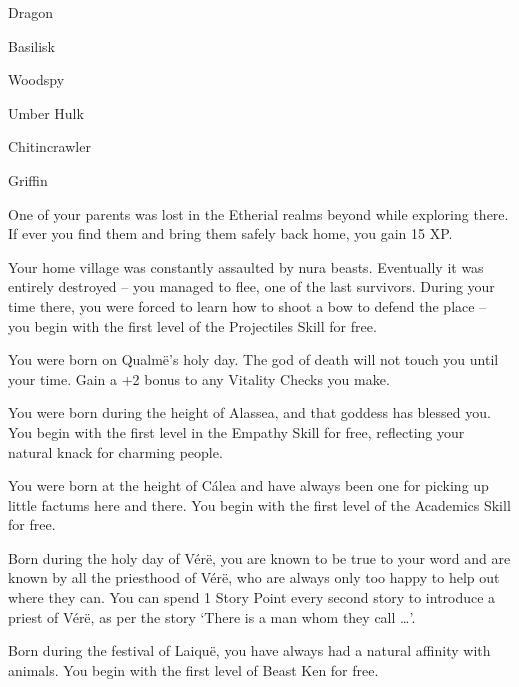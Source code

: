 \begin{multicols}{2}
\begin{list}{\addtocounter{list}{1}\textbf{:}}{\raggedleft}
\begin{list}{\addtocounter{enc}{-1}}{}
		\item Dragon

		\item Basilisk

		\item Woodspy

		\item Umber Hulk

		\item Chitincrawler

		\item Griffin

	\end{list}

\item{One of your parents was lost in the Etherial realms beyond while exploring there. If ever you find them and bring them safely back home, you gain 15 XP.}

\item{Your home village was constantly assaulted by nura beasts.  Eventually it was entirely destroyed -- you managed to flee, one of the last survivors. During your time there, you were forced to learn how to shoot a bow to defend the place -- you begin with the first level of the Projectiles Skill for free.}

\item{You were born on Qualm\"{e}'s holy day.  The god of death will not touch you until your time.  Gain a +2 bonus to any Vitality Checks you make.}

\item{You were born during the height of Alassea, and that goddess has blessed you.  You begin with the first level in the Empathy Skill for free, reflecting your natural knack for charming people.}

\item{You were born at the height of C\'{a}lea and have always been one for picking up little factums here and there.  You begin with the first level of the Academics Skill for free.}

\item{Born during the holy day of V\'{e}r\"{e}, you are known to be true to your word and are known by all the priesthood of V\'{e}r\"{e}, who are always only too happy to help out where they can.  You can spend 1 Story Point every second story to introduce a priest of V\'{e}r\"{e}, as per the story `There is a man whom they call \ldots'.}

\item{Born during the festival of Laiqu\"{e}, you have always had a natural affinity with animals.  You begin with the first level of Beast Ken for free.}


\end{list}
\end{multicols}
